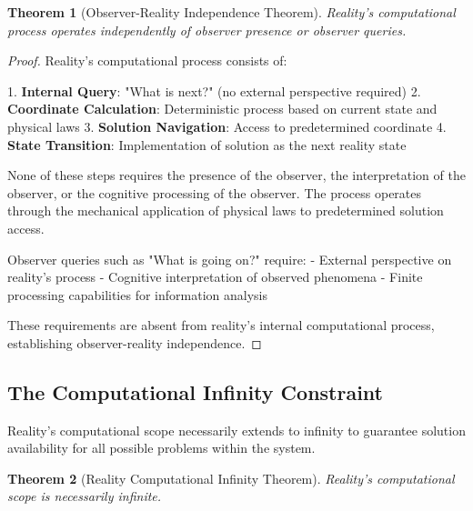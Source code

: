 \documentclass[12pt,a4paper]{article}
\newtheorem{theorem}{Theorem}[section]
\begin{document}
\begin{theorem}[Observer-Reality Independence Theorem]
Reality's computational process operates independently of observer presence or observer queries.
\end{theorem}

\begin{proof}
Reality's computational process consists of:

1. \textbf{Internal Query}: "What is next?" (no external perspective required)
2. \textbf{Coordinate Calculation}: Deterministic process based on current state and physical laws
3. \textbf{Solution Navigation}: Access to predetermined coordinate
4. \textbf{State Transition}: Implementation of solution as the next reality state

None of these steps requires the presence of the observer, the interpretation of the observer, or the cognitive processing of the observer. The process operates through the mechanical application of physical laws to predetermined solution access.

Observer queries such as "What is going on?" require:
- External perspective on reality's process
- Cognitive interpretation of observed phenomena
- Finite processing capabilities for information analysis

These requirements are absent from reality's internal computational process, establishing observer-reality independence.
\end{proof}

\subsection{The Computational Infinity Constraint}

Reality's computational scope necessarily extends to infinity to guarantee solution availability for all possible problems within the system.

\begin{theorem}[Reality Computational Infinity Theorem]
Reality's computational scope is necessarily infinite.
\end{theorem}
\end{document}
